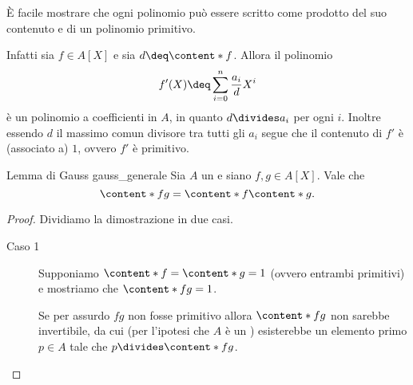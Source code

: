 È facile mostrare che ogni polinomio può essere scritto come prodotto del suo contenuto e di un polinomio primitivo. 

Infatti sia $f \in A[X]$ e sia $d \deq \content*{f}$. Allora il polinomio \[
    f'(X) \deq \sum_{i=0}^n \frac{a_i}{d}X^i    
\] è un polinomio a coefficienti in $A$, in quanto $d \divides a_i$ per ogni $i$. Inoltre essendo $d$ il massimo comun divisore tra tutti gli $a_i$ segue che il contenuto di $f'$ è (associato a) $1$, ovvero $f'$ è primitivo.

\begin{theorem}
    {Lemma di Gauss}
    {gauss_generale}
    Sia $A$ un \UFD e siano $f, g \in A[X]$. Vale che \[
        \content*{fg} = \content*{f}\content*{g}.    
    \]
\end{theorem}
\begin{proof}
    Dividiamo la dimostrazione in due casi.
    \begin{description}
        \item[Caso 1] Supponiamo $\content*{f} = \content*{g} = 1$ (ovvero entrambi primitivi) e mostriamo che $\content*{fg} = 1$.
        
        Se per assurdo $fg$ non fosse primitivo allora $\content*{fg}$ non sarebbe invertibile, da cui (per l'ipotesi che $A$ è un \UFD) esisterebbe un elemento primo $p \in A$ tale che $p \divides \content*{fg}$.


\end{description}
\end{proof}
